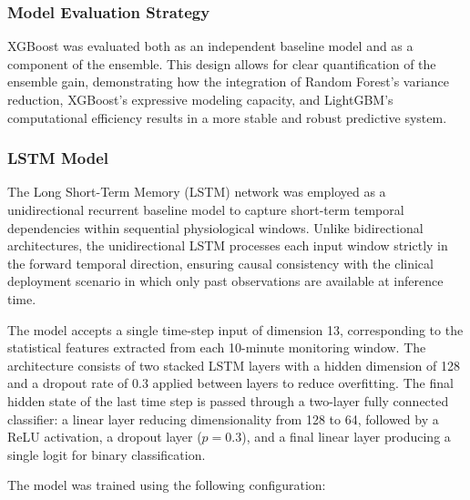 \documentclass[conference]{IEEEtran}
\begin{document}
\subsubsection{Model Evaluation Strategy}
XGBoost was evaluated both as an independent baseline model and as a component of the ensemble. This design allows for clear quantification of the ensemble gain, demonstrating how the integration of Random Forest’s variance reduction, XGBoost’s expressive modeling capacity, and LightGBM’s computational efficiency results in a more stable and robust predictive system.




\subsubsection{LSTM Model}

The Long Short-Term Memory (LSTM) network was employed 
as a unidirectional recurrent baseline model to capture 
short-term temporal dependencies within sequential 
physiological windows. Unlike bidirectional architectures, 
the unidirectional LSTM processes each input window 
strictly in the forward temporal direction, ensuring causal 
consistency with the clinical deployment scenario in which 
only past observations are available at inference time.

The model accepts a single time-step input of dimension 13, 
corresponding to the statistical features extracted from 
each 10-minute monitoring window. The architecture consists 
of two stacked LSTM layers with a hidden dimension of 128 
and a dropout rate of 0.3 applied between layers to reduce 
overfitting. The final hidden state of the last time step 
is passed through a two-layer fully connected classifier: 
a linear layer reducing dimensionality from 128 to 64, 
followed by a ReLU activation, a dropout layer 
(\(p = 0.3\)), and a final linear layer producing a single 
logit for binary classification.

The model was trained using the following configuration:
\end{document}
